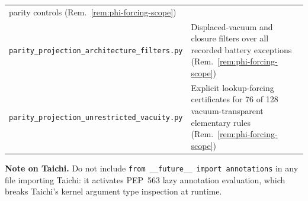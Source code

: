 \documentclass[11pt]{article}
\theoremstyle{remark}
\begin{document}
\begin{appendices}
\begin{center}
\begin{tabular}{@{}p{7.2cm}p{5.8cm}@{}}
    parity controls (Rem.~\ref{rem:phi-forcing-scope}) \\
\texttt{parity\_projection\_architecture\_filters.py}
  & Displaced-vacuum and closure filters over all recorded battery
    exceptions (Rem.~\ref{rem:phi-forcing-scope}) \\
\texttt{parity\_projection\_unrestricted\_vacuity.py}
  & Explicit lookup-forcing certificates for 76 of 128
    vacuum-transparent elementary rules
    (Rem.~\ref{rem:phi-forcing-scope}) \\
\bottomrule
\end{tabular}
\end{center}

\noindent\textbf{Note on Taichi.}
Do not include \texttt{from \_\_future\_\_ import annotations} in any file
importing Taichi: it activates PEP~563 lazy annotation evaluation, which breaks
Taichi's kernel argument type inspection at runtime.

\end{appendices}



\end{document}

